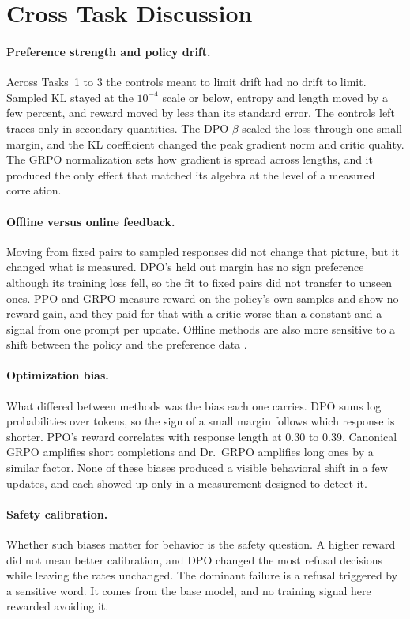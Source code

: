 \documentclass{article}
\begin{document}
\section{Cross Task Discussion}
\label{sec:cross}

\paragraph{Preference strength and policy drift.}
Across Tasks~1 to 3 the controls meant to limit drift had no drift to limit.
Sampled KL stayed at the $10^{-4}$ scale or below, entropy and length moved by a
few percent, and reward moved by less than its standard error. The controls left
traces only in secondary quantities. The DPO $\beta$ scaled the loss through one
small margin, and the KL coefficient changed the peak gradient norm and critic
quality. The GRPO normalization sets how gradient is spread across lengths, and
it produced the only effect that matched its algebra at the level of a measured
correlation.

\paragraph{Offline versus online feedback.}
Moving from fixed pairs to sampled responses did not change that picture, but it
changed what is measured. DPO's held out margin has no sign preference although
its training loss fell, so the fit to fixed pairs did not transfer to unseen
ones. PPO and GRPO measure reward on the policy's own samples and show no reward
gain, and they paid for that with a critic worse than a constant and a signal
from one prompt per update. Offline methods are also more sensitive to a shift
between the policy and the preference data \citep{xu2024dpo}.

\paragraph{Optimization bias.}
What differed between methods was the bias each one carries. DPO sums log
probabilities over tokens, so the sign of a small margin follows which response
is shorter. PPO's reward correlates with response length at 0.30 to 0.39. Canonical GRPO
amplifies short completions and Dr.\ GRPO amplifies long ones by a similar
factor. None of these biases produced a visible behavioral shift in a few
updates, and each showed up only in a measurement designed to detect it.

\paragraph{Safety calibration.}
Whether such biases matter for behavior is the safety question. A higher reward
did not mean better calibration, and DPO changed the most refusal decisions while
leaving the rates unchanged. The dominant failure is a refusal triggered by a
sensitive word. It comes from the base model, and no training signal here
rewarded avoiding it.
\end{document}
